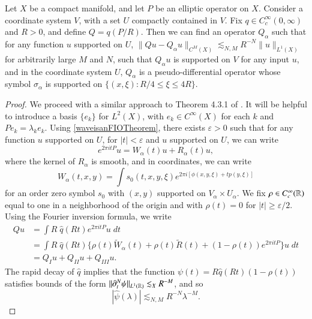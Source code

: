 \begin{theorem} \label{PseudoOsicllatoryLemma}
  Let $X$ be a compact manifold, and let $P$ be an elliptic operator on $X$. Consider a coordinate system $V$, with a set $U$ compactly contained in $V$. Fix $q \in C_c^\infty(0,\infty)$ and $R > 0$, and define $Q = q(P/R)$. Then we can find an operator $Q_\alpha$ such that for any function $u$ supported on $U$, $\| Qu - Q_\alpha u \|_{C^M(X)} \lesssim_{N,M} R^{-N} \| u \|_{L^1(X)}$ for arbitrarily large $M$ and $N$, such that $Q_\alpha u$ is supported on $V$ for any input $u$, and in the coordinate system $U$, $Q_\alpha$ is a pseudo-differential operator whose symbol $\sigma_\alpha$ is supported on $\{ (x,\xi): R/4 \leq \xi \leq 4R \}$.
\end{theorem}
\begin{proof}
  We proceed with a similar approach to Theorem 4.3.1 of \cite{Sogge}. It will be helpful to introduce a basis $\{ e_k \}$ for $L^2(X)$, with $e_k \in C^\infty(X)$ for each $k$ and $Pe_k = \lambda_k e_k$. Using \ref{waveisanFIOTheorem}, there exists $\varepsilon > 0$ such that for any function $u$ supported on $U$, for $|t| < \varepsilon$ and $u$ supported on $U$, we can write
  \[ e^{2 \pi i t P} u = W_\alpha(t) u + R_\alpha(t) u, \]
  where the kernel of $R_\alpha$ is smooth, and in coordinates, we can write
  \[ W_\alpha(t,x,y) = \int s_0(t,x,y,\xi) e^{2 \pi i [ \phi(x,y,\xi) + t p(y,\xi) ]} \]
  for an order zero symbol $s_0$ with $(x,y)$ supported on $V_\alpha \times U_\alpha$. We fix $\rho \in C_c^\infty(\operatorname{\mathbb{R}})$ equal to one in a neighborhood of the origin and with $\rho(t) = 0$ for $|t| \geq \varepsilon / 2$. Using the Fourier inversion formula, we write
    \begin{equation}
    \begin{split}
        Qu &= \int R\;\! \widehat{q}(R t) e^{2 \pi i t P}u\; dt\\
        &= \int R\;\! \widehat{q}(Rt) \Big\{ \rho(t) \tilde{W}_\alpha(t) + \rho(t) \tilde{R}(t) + (1 - \rho(t)) e^{2 \pi i t P} \Big\} u\; dt\\
        &= Q_I u + Q_{II} u + Q_{III} u.
    \end{split}
    \end{equation}
    The rapid decay of $\widehat{q}$ implies that the function $\psi(t) = R \widehat{q}(Rt) (1 - \rho(t))$ satisfies bounds of the form $\| \partial_t^N \psi \|_{L^1(\operatorname{\mathbb{R}})} \lesssim_X R^{-M}$, and so
    \begin{equation} \label{psidecaybound}
        |\widehat{\psi}(\lambda)| \lesssim_{N,M} R^{-N} \lambda^{-M}.

\end{equation}
\end{proof}
